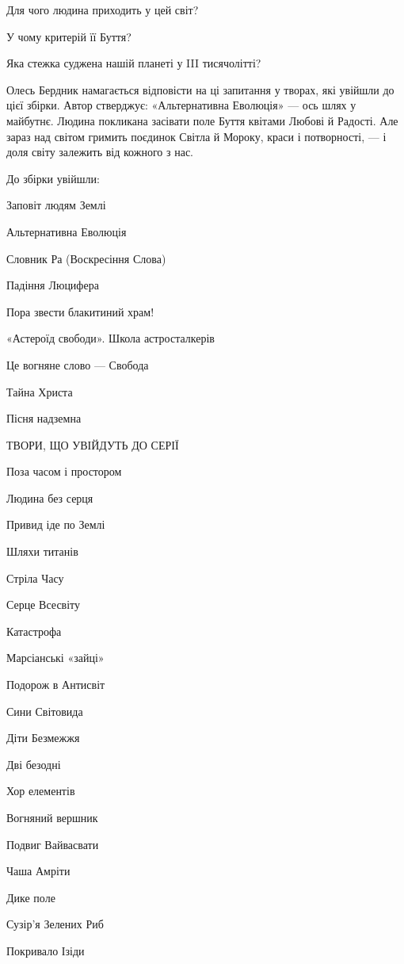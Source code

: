  
 

Для чого людина приходить у цей світ?

У чому критерій її Буття?

Яка стежка суджена нашій планеті у III тисячолітті?

Олесь Бердник намагається відповісти на ці запитання у творах, які увійшли до
цієї збірки. Автор стверджує: «Альтернативна Еволюція» — ось шлях у майбутнє.
Людина покликана засівати поле Буття квітами Любові й Радості. Але зараз над
світом гримить поєдинок Світла й Мороку, краси і потворності, — і доля світу
залежить від кожного з нас.

До збірки увійшли:

Заповіт людям Землі

Альтернативна Еволюція

Словник Ра (Воскресіння Слова)

Падіння Люцифера

Пора звести блакитиний храм!

«Астероїд свободи». Школа астросталкерів

Це вогняне слово — Свобода

Тайна Христа

Пісня надземна

ТВОРИ, ЩО УВІЙДУТЬ ДО СЕРІЇ

Поза часом і простором

Людина без серця

Привид іде по Землі

Шляхи титанів

Стріла Часу

Серце Всесвіту

Катастрофа

Марсіанські «зайці»

Подорож в Антисвіт

Сини Світовида

Діти Безмежжя

Дві безодні

Хор елементів

Вогняний вершник

Подвиг Вайвасвати

Чаша Амріти

Дике поле

Сузір’я Зелених Риб

Покривало Ізіди

